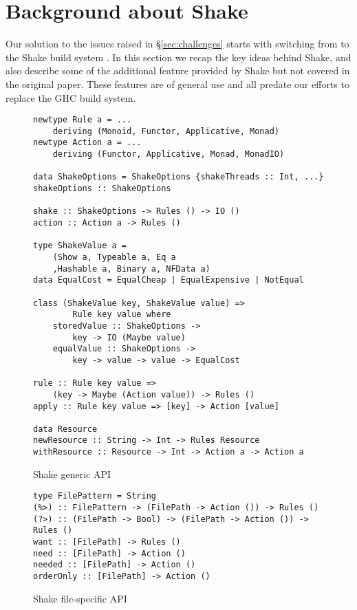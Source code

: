 \section{Background about Shake\label{sec:shake}}

Our solution to the issues raised in \S\ref{sec:challenges} starts with switching from \make{} to the Shake build system \cite{shake}. In this section we recap the key ideas behind Shake, and also describe some of the additional feature provided by Shake but not covered in the original paper. These features are of general use and all predate our efforts to replace the GHC build system.

\begin{figure}
\begin{lstlisting}
newtype Rule a = ...
    deriving (Monoid, Functor, Applicative, Monad)
newtype Action a = ...
    deriving (Functor, Applicative, Monad, MonadIO)

data ShakeOptions = ShakeOptions {shakeThreads :: Int, ...}
shakeOptions :: ShakeOptions

shake :: ShakeOptions -> Rules () -> IO ()
action :: Action a -> Rules ()

type ShakeValue a =
    (Show a, Typeable a, Eq a
    ,Hashable a, Binary a, NFData a)
data EqualCost = EqualCheap | EqualExpensive | NotEqual

class (ShakeValue key, ShakeValue value) =>
        Rule key value where
    storedValue :: ShakeOptions ->
        key -> IO (Maybe value)
    equalValue :: ShakeOptions ->
        key -> value -> value -> EqualCost

rule :: Rule key value =>
    (key -> Maybe (Action value)) -> Rules ()
apply :: Rule key value => [key] -> Action [value]

data Resource
newResource :: String -> Int -> Rules Resource
withResource :: Resource -> Int -> Action a -> Action a
\end{lstlisting}
\caption{Shake generic API\label{fig:shake_generic_api}}
\end{figure}

\begin{figure}
\begin{lstlisting}
type FilePattern = String
(%>) :: FilePattern -> (FilePath -> Action ()) -> Rules ()
(?>) :: (FilePath -> Bool) -> (FilePath -> Action ()) -> Rules ()
want :: [FilePath] -> Rules ()
need :: [FilePath] -> Action ()
needed :: [FilePath] -> Action ()
orderOnly :: [FilePath] -> Action ()
\end{lstlisting}
\caption{Shake file-specific API\label{fig:shake_file_api}}
\end{figure}

